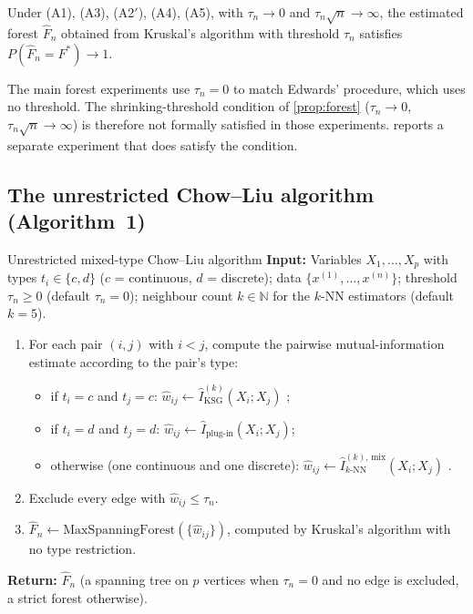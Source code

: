 \begin{proposition}
\label{prop:forest}
Under (A1), (A3), (A2$'$), (A4), (A5), with $\tau_n \to 0$ and
$\tau_n \sqrt{n} \to \infty$, the estimated forest $\hat{F}_n$
obtained from Kruskal's algorithm with threshold $\tau_n$ satisfies
$P(\hat{F}_n = F^*) \to 1$.
\end{proposition}

The main forest experiments use $\tau_n = 0$ to match Edwards'
procedure, which uses no threshold. The shrinking-threshold
condition of \cref{prop:forest} ($\tau_n \to 0$, $\tau_n \sqrt{n}
\to \infty$) is therefore not formally satisfied in those
experiments.  reports a separate experiment
that does satisfy the condition.

\subsection{The unrestricted Chow--Liu algorithm (Algorithm~1)}
\label{subsec:algorithm}

\begin{algBox}{Unrestricted mixed-type Chow--Liu algorithm}
\label{alg:main}
\textbf{Input:} Variables $X_1, \ldots, X_p$ with types
$t_i \in \{c, d\}$ ($c$ = continuous, $d$ = discrete); data
$\{x^{(1)}, \ldots, x^{(n)}\}$; threshold $\tau_n \ge 0$ (default
$\tau_n = 0$); neighbour count $k \in \mathbb{N}$ for the $k$-NN
estimators (default $k = 5$).
\begin{enumerate}
\item For each pair $(i, j)$ with $i < j$, compute the pairwise
mutual-information estimate according to the pair's type:
\begin{itemize}
\item if $t_i = c$ and $t_j = c$:
$\hat{w}_{ij} \gets \hat{I}^{(k)}_{\mathrm{KSG}}(X_i; X_j)$
\citep{kraskov2004estimating};
\item if $t_i = d$ and $t_j = d$:
$\hat{w}_{ij} \gets \hat{I}_{\mathrm{plug\text{-}in}}(X_i; X_j)$;
\item otherwise (one continuous and one discrete):
$\hat{w}_{ij} \gets \hat{I}^{(k),\,\mathrm{mix}}_{k\text{-NN}}(X_i; X_j)$
\citep{gao2017estimating}.
\end{itemize}
\item Exclude every edge with $\hat{w}_{ij} \le \tau_n$.
\item $\hat{F}_n \gets \mathrm{MaxSpanningForest}(\{\hat{w}_{ij}\})$,
computed by Kruskal's algorithm with no type restriction.
\end{enumerate}
\textbf{Return:} $\hat{F}_n$ (a spanning tree on $p$ vertices when
$\tau_n = 0$ and no edge is excluded, a strict forest otherwise).
\end{algBox}

